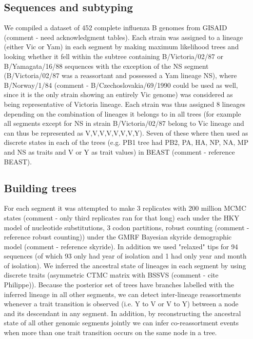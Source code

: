 \documentclass[11pt,oneside,letterpaper]{article}
\begin{document}
\subsection*{Sequences and subtyping}
We compiled a dataset of 452 complete influenza B genomes from GISAID (comment - need acknowledgment tables). 
Each strain was assigned to a lineage (either Vic or Yam) in each segment by making maximum likelihood trees and looking whether it fell within the subtree containing B/Victoria/02/87 or B/Yamagata/16/88 sequences with the exception of the NS segment (B/Victoria/02/87 was a reassortant and possessed a Yam lineage NS), where B/Norway/1/84 (comment - B/Czechoslovakia/69/1990 could be used as well, since it is the only strain showing an entirely Vic genome) was considered as being representative of Victoria lineage.
Each strain was thus assigned 8 lineages depending on the combination of lineages it belongs to in all trees (for example all segments except for NS in strain B/Victoria/02/87 belong to Vic lineage and can thus be represented as V,V,V,V,V,V,V,Y). 
Seven of these where then used as discrete states in each of the trees (e.g. PB1 tree had PB2, PA, HA, NP, NA, MP and NS as traits and V or Y as trait values) in BEAST (comment - reference BEAST).

\subsection*{Building trees}
For each segment it was attempted to make 3 replicates with 200 million MCMC states (comment - only third replicates ran for that long) each under the HKY model of nucleotide substitutions, 3 codon partitions, robust counting (comment - reference robust counting)) under the GMRF Bayesian skyride demographic model (comment - reference skyride).
In addition we used "relaxed" tips for 94 sequences (of which 93 only had year of isolation and 1 had only year and month of isolation).
We inferred the ancestral state of lineages in each segment by using discrete traits (asymmetric CTMC matrix with BSSVS (comment - cite Philippe)). Because the posterior set of trees have branches labelled with the inferred lineage in all other segments, we can detect inter-lineage reassortments whenever a trait transition is observed (i.e. Y to V or V to Y) between a node and its descendant in any segment. 
In addition, by reconstructing the ancestral state of all other genomic segments jointly we can infer co-reassortment events when more than one trait transition occurs on the same node in a tree.
\end{document}
